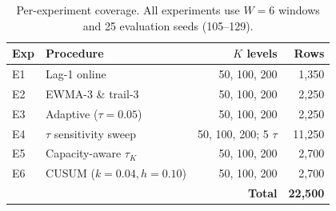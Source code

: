 \begin{table}[!t]
  \caption{Per-experiment coverage. All experiments use $W = 6$ windows
  and 25 evaluation seeds (105--129).}
  \label{tab:experiment_coverage}
  \centering
  \small
  \setlength{\tabcolsep}{4pt}
  \begin{tabular}{@{}llrr@{}}
    \toprule
    \textbf{Exp} & \textbf{Procedure} & \textbf{$K$ levels} & \textbf{Rows} \\
    \midrule
    E1 & Lag-1 online                 & 50, 100, 200       & 1{,}350 \\
    E2 & EWMA-3 \& trail-3            & 50, 100, 200       & 2{,}250 \\
    E3 & Adaptive ($\tau = 0.05$)     & 50, 100, 200       & 2{,}250 \\
    E4 & $\tau$ sensitivity sweep     & 50, 100, 200; 5 $\tau$ & 11{,}250 \\
    E5 & Capacity-aware $\tau_K$      & 50, 100, 200       & 2{,}700 \\
    E6 & CUSUM ($k{=}0.04, h{=}0.10$) & 50, 100, 200       & 2{,}700 \\
    \midrule
    \multicolumn{3}{r}{\textbf{Total}} & \textbf{22{,}500} \\
    \bottomrule
  \end{tabular}
\end{table}
